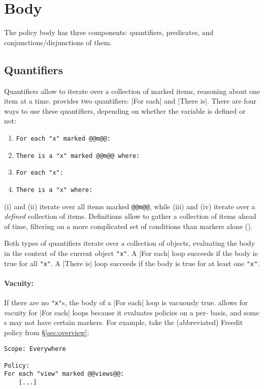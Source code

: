 \section{Body}
\label{sec:body}

The policy body has three components: quantifiers, predicates, and conjunctions/disjunctions of them.
%
\subsection{Quantifiers}
Quantifiers allow \ces{} to iterate over a collection of marked items, 
reasoning about one item at a time.
%
\syslang{} provides two quantifiers: |For each| and |There is|.
%
There are four ways to use these quantifiers, depending on whether the variable is defined or not:
%
\begin{enumerate}[label=(\roman*),nosep]
  \item \lstinline[language=CNL]|For each "x" marked @@m@@:|
  \item \lstinline[language=CNL]|There is a "x" marked @@m@@ where:|
  \item \lstinline[language=CNL]|For each "x":|
  \item \lstinline[language=CNL]|There is a "x" where:|
\end{enumerate}

(i) and (ii) iterate over all items marked \lstinline[language=CNL]|@@m@@|,
while (iii) and (iv) iterate over a \emph{defined} collection of items.
%
Definitions allow \ces{} to gather a collection of items ahead of time,
filtering on a more complicated set of conditions than markers alone ().

Both types of quantifiers iterate over a collection of objects,
evaluating the body in the context of the current object \lstinline[language=CNL]|"x"|.
%
A |For each| loop succeeds if the body is true for all \lstinline[language=CNL]|"x"|.
%
A |There is| loop succeeds if the body is true for at least one \lstinline[language=CNL]|"x"|.

\paragraph{Vacuity: }
If there are no \lstinline[language=CNL]|"x"|s, the body of a |For each| loop is vacuously true.
%
\syslang{} allows for vacuity for |For each| loops because it evaluates policies on a per-\controller{} basis,
and some \controller{}s may not have certain markers.
%
For example, take the (abbreviated) Freedit policy from \S\ref{sec:overview}:
\begin{lstlisting}[language=CNL]
Scope: Everywhere

Policy:
For each "view" marked @@views@@:
    [...]
\end{lstlisting}

